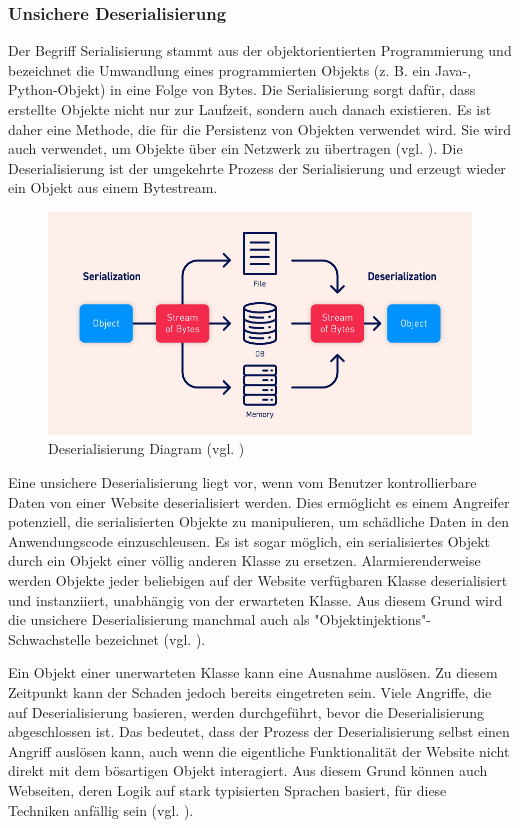 \subsubsection{Unsichere Deserialisierung}

Der Begriff Serialisierung stammt aus der objektorientierten
Programmierung und bezeichnet die Umwandlung eines programmierten
Objekts (z. B. ein Java-, Python-Objekt) in eine Folge von Bytes.
Die Serialisierung sorgt dafür, dass erstellte Objekte nicht nur zur
Laufzeit, sondern auch danach existieren. Es ist daher eine Methode,
die für die Persistenz von Objekten verwendet wird. Sie wird auch
verwendet, um Objekte über ein Netzwerk zu übertragen (vgl. \cite{serial}).
Die Deserialisierung ist der umgekehrte Prozess der Serialisierung und
erzeugt wieder ein Objekt aus einem Bytestream.

\begin{figure}[H]
    \centering
    \includegraphics[scale=0.4]{images/deserialization-diagram}
    \caption{Deserialisierung Diagram (vgl. \cite{deserial-img})} \label{fig:des}
\end{figure}

Eine unsichere Deserialisierung liegt vor, wenn vom Benutzer kontrollierbare
Daten von einer Website deserialisiert werden. Dies ermöglicht es einem
Angreifer potenziell, die serialisierten Objekte zu manipulieren, um
schädliche Daten in den Anwendungscode einzuschleusen. Es ist sogar
möglich, ein serialisiertes Objekt durch ein Objekt einer völlig anderen
Klasse zu ersetzen. Alarmierenderweise werden Objekte jeder beliebigen
auf der Website verfügbaren Klasse deserialisiert und instanziiert,
unabhängig von der erwarteten Klasse. Aus diesem Grund wird die unsichere
Deserialisierung manchmal auch als "Objektinjektions"-Schwachstelle
bezeichnet  (vgl. \cite{deserial-img}).

Ein Objekt einer unerwarteten Klasse kann eine Ausnahme auslösen.
Zu diesem Zeitpunkt kann der Schaden jedoch bereits eingetreten sein.
Viele Angriffe, die auf Deserialisierung basieren, werden durchgeführt,
bevor die Deserialisierung abgeschlossen ist. Das bedeutet, dass der
Prozess der Deserialisierung selbst einen Angriff auslösen kann, auch
wenn die eigentliche Funktionalität der Website nicht direkt mit dem
bösartigen Objekt interagiert. Aus diesem Grund können auch Webseiten,
deren Logik auf stark typisierten Sprachen basiert, für diese Techniken
anfällig sein  (vgl. \cite{deserial-img}).
